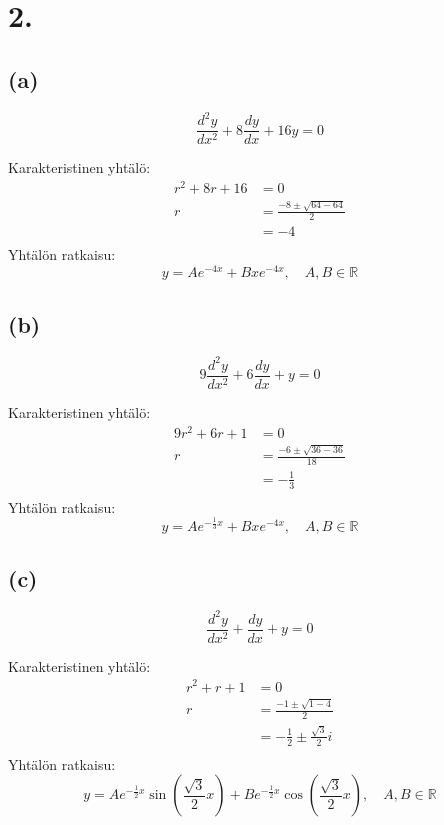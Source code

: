 \documentclass{article}
\begin{document}
\section*{2.}

\subsection*{(a)}

\[
  \frac{d^2 y}{d x^2} + 8\frac{dy}{dx} + 16y = 0
\]

Karakteristinen yhtälö:
\begin{align*}
  r^2 + 8r + 16 &= 0 \\
  r &= \frac{-8 \pm \sqrt{64 - 64}}{2} \\
    &= -4 \\
\end{align*}
Yhtälön ratkaisu:
\[
  y = Ae^{-4x} + Bxe^{-4x}, \quad A,B \in \mathbb{R}
\]

\subsection*{(b)}

\[
  9\frac{d^2 y}{d x^2} + 6\frac{dy}{dx} + y = 0
\]

Karakteristinen yhtälö:
\begin{align*}
  9r^2 + 6r + 1 &= 0 \\
  r &= \frac{-6 \pm \sqrt{36 - 36}}{18} \\
    &= -\frac{1}{3} \\
\end{align*}
Yhtälön ratkaisu:
\[
  y = Ae^{-\frac{1}{3}x} + Bxe^{-4x}, \quad A,B \in \mathbb{R}
\]

\subsection*{(c)}

\[
  \frac{d^2 y}{d x^2} + \frac{dy}{dx} + y = 0
\]

Karakteristinen yhtälö:
\begin{align*}
  r^2 + r + 1 &= 0 \\
  r &= \frac{-1 \pm \sqrt{1 - 4}}{2} \\
    &= -\frac{1}{2} \pm \frac{\sqrt{3}}{2}i \\
\end{align*}
Yhtälön ratkaisu:
\[
  y = Ae^{-\frac{1}{2}x}\sin(\frac{\sqrt{3}}{2}x)
    + Be^{-\frac{1}{2}x}\cos(\frac{\sqrt{3}}{2}x), \quad A,B \in \mathbb{R}
\]
\end{document}
